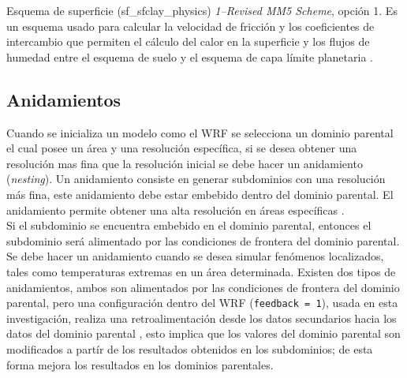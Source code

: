 Esquema de superficie (sf\_sfclay\_physics) \textit{1–Revised MM5 Scheme}, opción 1. Es un esquema usado para calcular la velocidad de fricción y los coeficientes de intercambio que permiten el cálculo del calor en la superficie y los flujos de humedad entre el esquema de suelo y el esquema de capa límite planetaria \citep{Skamarock2008}.
\begin{comment}

  &physics
  mp_physics               = 3,     3,     3,
  ra_lw_physics            = 1,     1,     1,
  ra_sw_physics            = 1,     1,     1,
  radt                     = 30,   30,    30,
  sf_sfclay_physics        = 1,     1,     1,
  sf_surface_physics       = 1,     1,     1,
  bl_pbl_physics           = 1,     1,     1,
  bldt                     = 0,     0,     0,
  cu_physics               = 1,     1,     0,
  cudt                     = 5,     5,     5,
  isfflx                   = 1,
  ifsnow                   = 0,
  icloud                   = 1,
  surface_input_source     = 1,
  num_soil_layers          = 4,
  num_land_cat             = 24,
  sf_urban_physics         = 0,
  mp_zero_out              = 0,
  maxiens                  = 1,
  maxens                   = 3,
  maxens2                  = 3,
  maxens3                  = 16,
  ensdim                   = 144,
  /
\end{comment}



\subsection{Anidamientos}

Cuando se inicializa un modelo como el WRF se selecciona un dominio parental el cual posee un área y una resolución específica, si se desea obtener una resolución mas fina que la resolución inicial se debe hacer un anidamiento (\textit{nesting}). Un anidamiento consiste en generar subdominios con una resolución más fina, este anidamiento debe estar embebido dentro del dominio parental. El anidamiento permite obtener una alta resolución en áreas específicas \citep{Werner2017}.\\

Si el subdominio se encuentra embebido en el dominio parental, entonces el subdominio será alimentado por las condiciones de frontera del dominio parental. Se debe hacer un anidamiento cuando se desea simular fenómenos localizados, tales como temperaturas extremas en un área determinada. Existen dos tipos de anidamientos, ambos son alimentados por las condiciones de frontera del dominio parental, pero una configuración dentro del WRF (\texttt{feedback = 1}), usada en esta investigación, realiza una retroalimentación desde los datos secundarios hacia los datos del dominio parental \citep{Werner2017}, esto implica que los valores del dominio parental son modificados a partír de los resultados obtenidos en los subdominios; de esta forma mejora los resultados en los dominios parentales.\\

